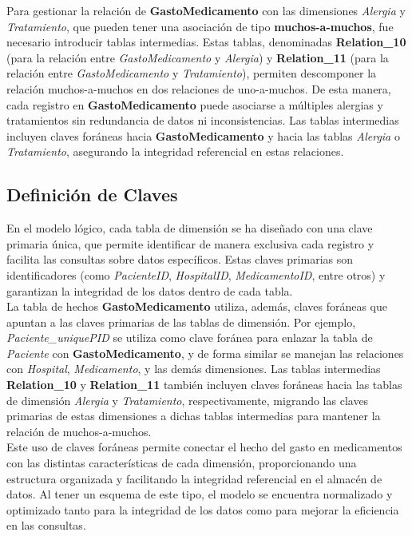 \documentclass{article}
\begin{document}
Para gestionar la relación de \textbf{GastoMedicamento} con las dimensiones \textit{Alergia} y \textit{Tratamiento}, que pueden tener una asociación de tipo \textbf{muchos-a-muchos}, fue necesario introducir tablas intermedias. Estas tablas, denominadas \textbf{Relation\_10} (para la relación entre \textit{GastoMedicamento} y \textit{Alergia}) y \textbf{Relation\_11} (para la relación entre \textit{GastoMedicamento} y \textit{Tratamiento}), permiten descomponer la relación muchos-a-muchos en dos relaciones de uno-a-muchos. De esta manera, cada registro en \textbf{GastoMedicamento} puede asociarse a múltiples alergias y tratamientos sin redundancia de datos ni inconsistencias. Las tablas intermedias incluyen claves foráneas hacia \textbf{GastoMedicamento} y hacia las tablas \textit{Alergia} o \textit{Tratamiento}, asegurando la integridad referencial en estas relaciones.

\subsection{Definición de Claves}
En el modelo lógico, cada tabla de dimensión se ha diseñado con una clave primaria única, que permite identificar de manera exclusiva cada registro y facilita las consultas sobre datos específicos. Estas claves primarias son identificadores (como \textit{PacienteID}, \textit{HospitalID}, \textit{MedicamentoID}, entre otros) y garantizan la integridad de los datos dentro de cada tabla.
\\

La tabla de hechos \textbf{GastoMedicamento} utiliza, además, claves foráneas que apuntan a las claves primarias de las tablas de dimensión. Por ejemplo, \textit{Paciente\_uniquePID} se utiliza como clave foránea para enlazar la tabla de \textit{Paciente} con \textbf{GastoMedicamento}, y de forma similar se manejan las relaciones con \textit{Hospital}, \textit{Medicamento}, y las demás dimensiones. Las tablas intermedias \textbf{Relation\_10} y \textbf{Relation\_11} también incluyen claves foráneas hacia las tablas de dimensión \textit{Alergia} y \textit{Tratamiento}, respectivamente, migrando las claves primarias de estas dimensiones a dichas tablas intermedias para mantener la relación de muchos-a-muchos.
\\

Este uso de claves foráneas permite conectar el hecho del gasto en medicamentos con las distintas características de cada dimensión, proporcionando una estructura organizada y facilitando la integridad referencial en el almacén de datos. Al tener un esquema de este tipo, el modelo se encuentra normalizado y optimizado tanto para la integridad de los datos como para mejorar la eficiencia en las consultas.
\end{document}
